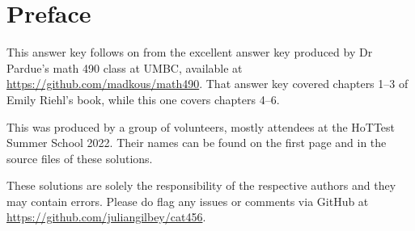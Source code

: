 \documentclass[main]{subfiles}
\begin{document}
\chapter*{Preface}

This answer key follows on from the excellent answer key produced by
Dr Pardue's math 490 class at UMBC, available at
\url{https://github.com/madkous/math490}.  That answer key covered
chapters 1--3 of Emily Riehl's book, while this one covers chapters
4--6.

This was produced by a group of volunteers, mostly attendees at the
HoTTest Summer School 2022.  Their names can be found on the first
page and in the source files of these solutions.

These solutions are solely the responsibility of the respective
authors and they may contain errors.  Please do flag any issues or
comments via GitHub at \url{https://github.com/juliangilbey/cat456}.
\end{document}
